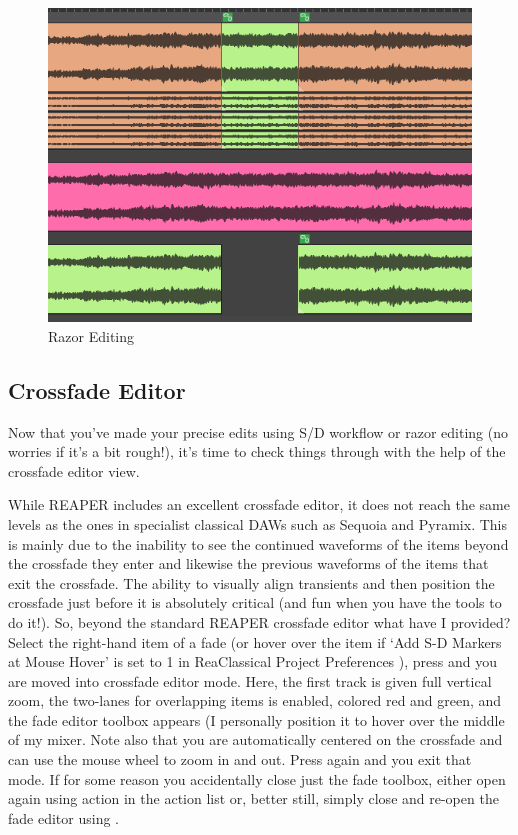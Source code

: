 \documentclass[10pt,american]{article}
\begin{document}
\begin{figure}
\includegraphics[width=1\linewidth]{user_guide_images/razor}

\caption{Razor Editing}

\end{figure}


\subsection{Crossfade Editor}

Now that you've made your precise edits using S/D workflow or razor editing (no
worries if it's a bit rough!), it's time to check things through with the help
of the crossfade editor view.

While REAPER includes an excellent crossfade editor, it does not reach the same
levels as the ones in specialist classical DAWs such as Sequoia and Pyramix.
This is mainly due to the inability to see the continued waveforms of the items
beyond the crossfade they enter and likewise the previous waveforms of the items
that exit the crossfade. The ability to visually align transients and then
position the crossfade just before it is absolutely critical (and fun when you
have the tools to do it!). So, beyond the standard REAPER crossfade editor what
have I provided? Select the right-hand item of a fade (or hover over the item if
`Add S-D Markers at Mouse Hover' is set to 1 in ReaClassical Project Preferences
), press  and you are moved into crossfade editor mode. Here,
the first track is given full vertical zoom, the two-lanes for overlapping items
is enabled, colored red and green, and the fade editor toolbox appears (I
personally position it to hover over the middle of my mixer. Note also that you
are automatically centered on the crossfade and can use the mouse wheel to zoom
in and out. Press  again and you exit that mode. If for some reason you
accidentally close just the fade toolbox, either open again using action in the
action list or, better still, simply close and re-open the fade editor using
 .
\end{document}
